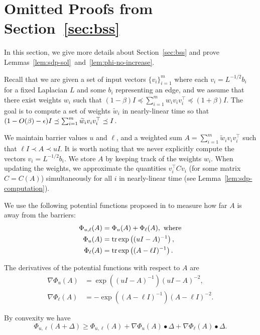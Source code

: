 
\section{Omitted Proofs from Section~\ref{sec:bss}}
\label{app:bss}

In this section, we give more details about Section~\ref{sec:bss} and prove Lemmas~\ref{lem:sdp-sol}~and~\ref{lem:phi-no-increase}.

Recall that we are given a set of input vectors $\{v_i\}_{i=1}^m$ where each $v_i = L^{-1/2} b_i$ for a fixed Laplacian $L$ and some $b_i$ representing an edge, and we assume that there exist weights $w_i$ such that $(1-\beta) I \preceq \sum_{i=1}^m w_i v_i v_i^\top \preceq (1+\beta) I$.
The goal is to compute a set of weights $\tilde w_i$ in nearly-linear time so that $(1-O(\beta)-\epsilon)I \preceq \sum_{i=1}^m \widetilde w_i v_i v_i^\top \preceq I$.

We maintain barrier values $u$ and $\ell$, and a weighted sum $A = \sum_{i=1}^m \tilde w_i v_iv_i^\top$ such that $\ell I \prec A \prec uI$.
It is worth noting that we never explicitly compute the vectors $v_i = L^{-1/2} b_i$.  We store $A$ by keeping track of the weights $w_i$.
When updating the weights, we approximate the quantities $v_i^\top C v_i$ (for some matrix $C = C(A)$) simultaneously for all $i$ in nearly-linear time (see Lemma~\ref{lem:sdp-computation}).

We use the following potential functions proposed in \citep{LeeS17} to measure how far $A$ is away from the barriers:
\begin{align*}
\Phi_{u,\ell}(A) & = \Phi_u(A)+\Phi_{\ell}(A), \text{ where} \\
\Phi_u(A) & = \operatorname{tr} \exp \left((u I - A)^{-1}\right), \\
\Phi_\ell(A) & = \operatorname{tr} \exp \left((A - \ell I)^{-1}\right).
\end{align*}

The derivatives of the potential functions with respect to $A$ are
\begin{align*}
\nabla \Phi_u (A) & = \exp \left((u I - A)^{-1}\right) (u I - A)^{-2}, \\ %
\nabla \Phi_\ell (A) & = - \exp \left((A - \ell I)^{-1}\right) (A - \ell I)^{-2}.
\end{align*}

By convexity we have
\[
\Phi_{u,\ell}(A+\Delta) \ge \Phi_{u,\ell}(A) + \nabla \Phi_{u}(A) \bullet \Delta + \nabla \Phi_{\ell}(A) \bullet \Delta.
\]

